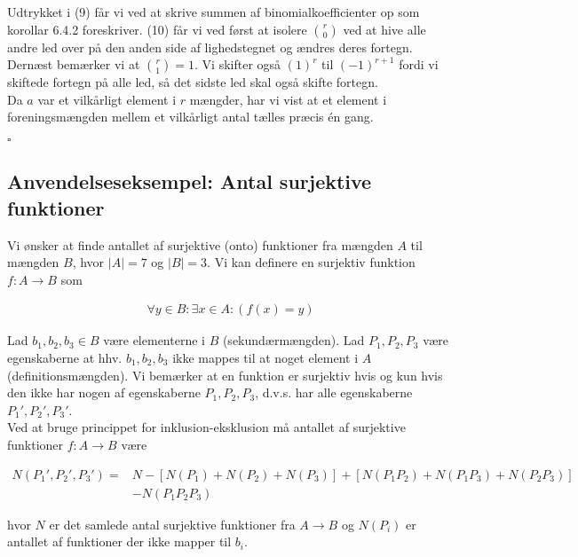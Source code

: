 \documentclass[12pt]{article}
\begin{document}
Udtrykket i (9) får vi ved at skrive summen af binomialkoefficienter op som korollar 6.4.2 foreskriver. (10) får vi ved først at isolere $\binom{r}{0}$ ved at hive alle andre led over på den anden side af lighedstegnet og ændres deres fortegn. Dernæst bemærker vi at $\binom{r}{1}=1$. Vi skifter også $(1)^r$ til $(-1)^{r+1}$ fordi vi skiftede fortegn på alle led, så det sidste led skal også skifte fortegn. \\

Da $a$ var et vilkårligt element i $r$ mængder, har vi vist at et element i foreningsmængden mellem et vilkårligt antal tælles præcis én gang.

\begin{flushright}
    $\square$
\end{flushright}

\subsection*{Anvendelseseksempel: Antal surjektive funktioner}

Vi ønsker at finde antallet af surjektive (onto) funktioner fra mængden $A$ til mængden $B$, hvor $|A|=7$ og $|B|=3$. Vi kan definere en surjektiv funktion $f: A \rightarrow B$ som 

\begin{align*}
    \forall y \in B: \exists x \in A: (f(x)=y) 
\end{align*}

Lad $b_1, b_2, b_3 \in B$ være elementerne i $B$ (sekundærmængden). Lad $P_1, P_2, P_3$ være egenskaberne at hhv. $b_1, b_2, b_3$ ikke mappes til at noget element i $A$ (definitionsmængden). Vi bemærker at en funktion er surjektiv hvis og kun hvis den ikke har nogen af egenskaberne $P_1, P_2, P_3$, d.v.s. har alle egenskaberne $P_1', P_2', P_3'$. \\

Ved at bruge princippet for inklusion-eksklusion må antallet af surjektive funktioner $f: A \rightarrow B$ være 

\begin{align*}
    N(P_1', P_2', P_3') =& N-[N(P_1)+N(P_2)+N(P_3)] + [N(P_1P_2) + N(P_1P_3) +N(P_2P_3)] \\\
    &- N(P_1P_2P_3) 
\end{align*}

hvor $N$ er det samlede antal surjektive funktioner fra $A \rightarrow B$ og $N(P_i)$ er antallet af funktioner der ikke mapper til $b_i$. \\
\end{document}
